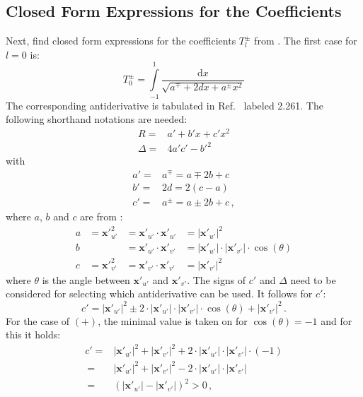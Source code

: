 \FloatBarrier
\subsection{Closed Form Expressions for the Coefficients}
Next, find closed form expressions for the coefficients $T^{\pm}_l$ from .
The first case for $l=0$ is:
\begin{equation}
 T^{\pm}_0 = \int\limits_{-1}^{1} \frac{\mathrm{d}x}{\sqrt{ a^{\mp}  + 2 d x + a^{\pm} x^2 }}
\end{equation}
The corresponding antiderivative is tabulated in Ref.~\cite{gradshteyn_ryzhik} labeled 2.261.
The following shorthand notations are needed:
\begin{align}
      R =& {a'} + {b'} x + {c'} x^2 \label{eqn:def_R} \\
 \Delta =& 4 {a'} {c'} - {b'}^2 \label{eqn:def_delta}
\end{align}
with
\begin{align}
 {a'} =& a^{\mp} = a \mp 2 b + c \nonumber \\
 {b'} =& 2 d = 2 (c-a) \label{eqn:def_primes} \\
 {c'} =& a^{\pm} = a \pm 2 b + c \nonumber \, ,
\end{align}
where $a$, $b$ and $c$ are from :
\begin{equation}
 \begin{array}{llll}
 a &= {\mathbf{x}'}_{u'}^2 &= {\mathbf{x}'}_{u'} \cdot {\mathbf{x}'}_{u'} &= |{\mathbf{x}'}_{u'}|^2\\
 b &        ~              &= {\mathbf{x}'}_{u'} \cdot {\mathbf{x}'}_{v'} &= |{\mathbf{x}'}_{u'}| \cdot |{\mathbf{x}'}_{v'}| \cdot \cos(\theta) \\
 c &= {\mathbf{x}'}_{v'}^2 &= {\mathbf{x}'}_{v'} \cdot {\mathbf{x}'}_{v'} &= |{\mathbf{x}'}_{v'}|^2
 \end{array}
\end{equation}
where $\theta$ is the angle between ${\mathbf{x}'}_{u'}$ and ${\mathbf{x}'}_{v'}$.
The signs of $c'$ and $\Delta$ need to be considered for selecting which antiderivative can be used.
It follows for $c'$:
\begin{equation}
 {c'} = |{\mathbf{x}'}_{u'}|^2 \pm 2 \cdot |{\mathbf{x}'}_{u'}| \cdot |{\mathbf{x}'}_{v'}| \cdot \cos(\theta) + |{\mathbf{x}'}_{v'}|^2 \, .
\end{equation}
For the case of $(+)$, the minimal value is taken on for $\cos(\theta)=-1$ and for this it holds:
\begin{align}
 {c'} =& |{\mathbf{x}'}_{u'}|^2 + |{\mathbf{x}'}_{v'}|^2 + 2 \cdot |{\mathbf{x}'}_{u'}| \cdot |{\mathbf{x}'}_{v'}| \cdot (-1) \nonumber \\
   ~  =& |{\mathbf{x}'}_{u'}|^2 + |{\mathbf{x}'}_{v'}|^2 - 2 \cdot |{\mathbf{x}'}_{u'}| \cdot |{\mathbf{x}'}_{v'}|            \nonumber \\
   ~  =& \left( |{\mathbf{x}'}_{u'}| - |{\mathbf{x}'}_{v'}| \right)^2 > 0 \, , \label{eqn:check_c_prime}
\end{align}
